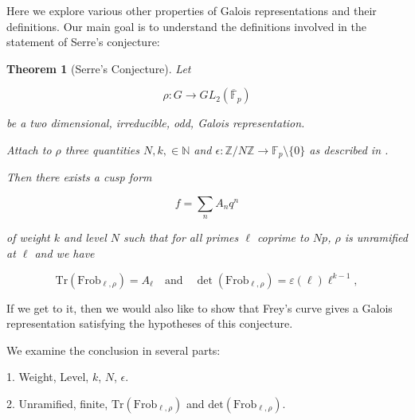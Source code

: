 \documentclass{article}
\newtheorem{thm}{Theorem}[section]
\theoremstyle{definition}
\theoremstyle{definition}
\theoremstyle{definition}
\newcommand{\Z}{\mathbb{Z}}
\newcommand{\F}{\mathbb{F}}
\newcommand{\N}{\mathbb{N}}
\begin{document}
Here we explore various other properties of Galois representations and their definitions.
\newline\newline
Our main goal is to understand the definitions involved in the statement of Serre's conjecture:

\begin{thm}[Serre's Conjecture]

Let 

$$\rho: G\to GL_2(\overline{\F}_p)$$

be a two dimensional, irreducible, odd, Galois representation. 

Attach to $\rho$ three quantities $N,k,\in\N$ and $\epsilon:\Z/N\Z\to\F_p\setminus\{0\} $ as described in \cite{Serre}.

Then there exists a cusp form

$$f=\sum_n A_nq^n$$

of weight $k$ and level $N$ such that for all primes $\ell$ coprime to $Np$, $\rho$ is unramified at $\ell$ and we have

$$\mathrm{Tr}(\mathrm{Frob}_{\ell, \rho}) = A_\ell \quad \text{and} \quad \det(\mathrm{Frob}_{\ell, \rho}) = \varepsilon(\ell) \ell^{k-1},
$$
    
\end{thm}



If we get to it, then we would also like to show that Frey's curve gives a Galois representation satisfying the hypotheses of this conjecture.



We examine the conclusion in several parts:

1. Weight, Level, $k$, $N$, $\epsilon$.

2. Unramified, finite, $\mathrm{Tr}(\mathrm{Frob}_{\ell, \rho})$ and $\mathrm{det}(\mathrm{Frob}_{\ell, \rho})$.





\end{document}
